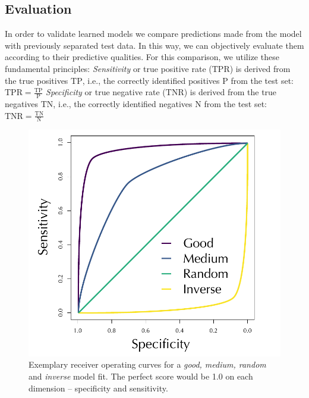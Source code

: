 \documentclass[conference]{IEEEtran}
\begin{document}
\subsection{Evaluation} %
In order to validate learned models we compare predictions made from the model with previously separated test data. In this way, we can objectively evaluate them according to their predictive qualities. For this comparison, we utilize these fundamental principles:
\newline \textit{Sensitivity} or true positive rate ($\mathrm{TPR}$) is derived from the true positives $\mathrm{TP}$,  i.e., the correctly identified positives $\mathrm{P}$ from the test set: 
$
\mathrm{TPR}=\frac{\mathrm{TP}}{\mathrm{P}}
$
\newline \textit{Specificity} or true negative rate ($\mathrm{TNR}$) is derived from the true negatives $\mathrm{TN}$,  i.e., the correctly identified negatives $\mathrm{N}$ from the test set: 
$
\mathrm{TNR}=\frac{\mathrm{TN}}{\mathrm{N}}
$

\begin{figure}[h!]
    \centering
    \includegraphics[width=.85\linewidth]{pictures/ROC.pdf}
    \caption[ROC explanation]{Exemplary receiver operating curves for  a \textit{good, medium, random} and \textit{inverse} model fit. The perfect score would be 1.0 on each dimension -- specificity and sensitivity.}
    \label{fig:exroc}
    \end{figure}
\end{document}
